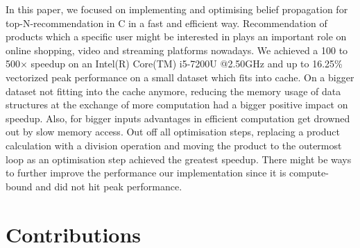 \documentclass[letterpaper]{article}
\begin{document}
In this paper, we focused on implementing and optimising belief propagation for top-N-recommendation in C in a fast and efficient way.
Recommendation of products which a specific user might be interested in plays an important role on online shopping, video and streaming platforms nowadays. 
We achieved a 100 to 500$\times$ speedup on an Intel(R) Core(TM) i5-7200U @2.50GHz and up to 16.25\% vectorized peak performance on a small dataset which fits into cache.
On a bigger dataset not fitting into the cache anymore, reducing the memory usage of data structures at the exchange of more computation had a bigger positive impact on speedup.
Also, for bigger inputs advantages in efficient computation get drowned out by slow memory access.
Out off all optimisation steps, replacing a product calculation with a division operation and moving the product to the outermost loop as an optimisation step achieved the greatest speedup.\sr{*}
There might be ways to further improve the performance our implementation since it is compute-bound and did not hit peak performance.\sr{*}


\section{Contributions}%


\end{document}
